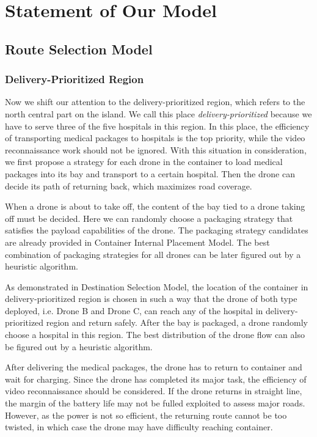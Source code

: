 \documentclass{mcmthesis}
\begin{document}
\linespread{0.6} %
\setlength{\parskip}{0.5\baselineskip} %

\section{Statement of Our Model}
\subsection{Route Selection Model}
\subsubsection{Delivery-Prioritized Region}
Now we shift our attention to the delivery-prioritized region, which refers to the north central part on the island. We call this place \emph{delivery-prioritized} because we have to serve three of the five hospitals in this region. In this place, the efficiency of transporting medical packages to hospitals is the top priority, while the video reconnaissance work should not be ignored. With this situation in consideration, we first propose a strategy for each drone in the container to load medical packages into its bay and transport to a certain hospital. Then the drone can decide its path of returning back, which maximizes road coverage.

When a drone is about to take off, the content of the bay tied to a drone taking off must be decided. Here we can randomly choose a packaging strategy that satisfies the payload capabilities of the drone. The packaging strategy candidates are already provided in Container Internal Placement Model. The best combination of packaging strategies for all drones can be later figured out by a heuristic algorithm.

As demonstrated in Destination Selection Model, the location of the container in delivery-prioritized region is chosen in such a way that the drone of both type deployed, i.e. Drone B and Drone C, can reach any of the hospital in delivery-prioritized region and return safely. After the bay is packaged, a drone randomly choose a hospital in this region. The best distribution of the drone flow can also be figured out by a heuristic algorithm.

After delivering the medical packages, the drone has to return to container and wait for charging. Since the drone has completed its major task, the efficiency of video reconnaissance should be considered. If the drone returns in straight line, the margin of the battery life may not be fulled exploited to assess major roads. However, as the power is not so efficient, the returning route cannot be too twisted, in which case the drone may have difficulty reaching container. 
\end{document}
